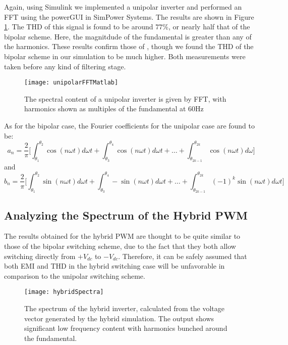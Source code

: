 Again, using Simulink we implemented a unipolar inverter and performed an FFT using the powerGUI in SimPower Systems. The results are shown in Figure \ref{unipolarFFTMatlab}. The THD of this signal is found to be around $77\%$, or nearly half that of the bipolar scheme. Here, the magnitdude of the fundamental is greater than any of the harmonics. These results confirm those of \cite{FourierAnalysis}, though we found the THD of the bipolar scheme in our simulation to be much higher. Both measurements were taken before any kind of filtering stage. 

\begin{figure}
\centering
\texttt{[image: unipolarFFTMatlab]}
\caption{The spectral content of a unipolar inverter is given by FFT, with harmonics shown as multiples of the fundamental at 60Hz}
\label{unipolarFFTMatlab}
\end{figure}

As for the bipolar case, the Fourier coefficients for the unipolar case are found to be:
\begin{equation}
a_n = \frac{2}{\pi} \Big[\int_{\theta_1}^{\theta_2} \cos(n\omega t) d\omega t + \int_{\theta_3}^{\theta_4} \cos(n\omega t)d\omega t +\ldots +
\int_{\theta_{2k-1}}^{\theta_{2k}} \cos(n\omega t)d\omega \Big]
\end{equation} 
and 
\begin{equation}
b_n = \frac{2}{\pi} \Big[\int_{\theta_1}^{\theta_2} \sin(n\omega t) d\omega t + \int_{\theta_3}^{\theta_4} -\sin(n\omega t)d\omega t +\ldots +
\int_{\theta_{2k-1}}^{\theta_{2k}} (-1)^k \sin(n\omega t)d\omega t \Big]
\end{equation} 

\subsection{Analyzing the Spectrum of the Hybrid PWM}
The results obtained for the hybrid PWM are thought to be quite similar to those of the bipolar switching scheme, due to the fact that they both allow switching directly from $+V_{dc}$ to $-V_{dc}$. Therefore, it can be safely assumed that both EMI and THD in the hybrid switching case will be unfavorable in comparison to the unipolar switching scheme.

\begin{figure}[ht]
\centering
\texttt{[image: hybridSpectra]}
\caption{The spectrum of the hybrid inverter, calculated from the voltage vector generated by the hybrid simulation. The output shows significant low frequency content with harmonics bunched around the fundamental.}
\label{hybridSpectra}
\end{figure}

